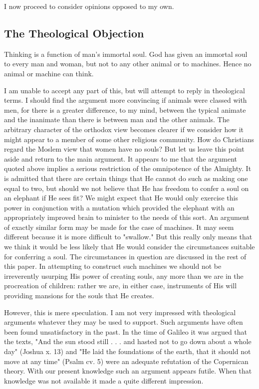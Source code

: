 \documentclass{article}
\begin{document}
I now proceed to consider opinions opposed to my own.


\subsection{The Theological Objection}

Thinking is a function of man's immortal soul. God has given an immortal soul to every man and woman, but not to any other animal or to machines. Hence no animal or machine can think.

I am unable to accept any part of this, but will attempt to reply in theological terms. I should find the argument more convincing if animals were classed with men, for there is a greater difference, to my mind, between the typical animate and the inanimate than there is between man and the other animals. The arbitrary character of the orthodox view becomes clearer if we consider how it might appear to a member of some other religious community. How do Christians regard the Moslem view that women have no souls? But let us leave this point aside and return to the main argument. It appears to me that the argument quoted above implies a serious restriction of the omnipotence of the Almighty. It is admitted that there are certain things that He cannot do such as making one equal to two, but should we not believe that He has freedom to confer a soul on an elephant if He sees fit? We might expect that He would only exercise this power in conjunction with a mutation which provided the elephant with an appropriately improved brain to minister to the needs of this sort. An argument of exactly similar form may be made for the case of machines. It may seem different because it is more difficult to "swallow." But this really only means that we think it would be less likely that He would consider the circumstances suitable for conferring a soul. The circumstances in question are discussed in the rest of this paper. In attempting to construct such machines we should not be irreverently usurping His power of creating souls, any more than we are in the procreation of children: rather we are, in either case, instruments of His will providing mansions for the souls that He creates.

However, this is mere speculation. I am not very impressed with theological arguments whatever they may be used to support. Such arguments have often been found unsatisfactory in the past. In the time of Galileo it was argued that the texts, "And the sun stood still . . . and hasted not to go down about a whole day" (Joshua x. 13) and "He laid the foundations of the earth, that it should not move at any time" (Psalm cv. 5) were an adequate refutation of the Copernican theory. With our present knowledge such an argument appears futile. When that knowledge was not available it made a quite different impression.
\end{document}
